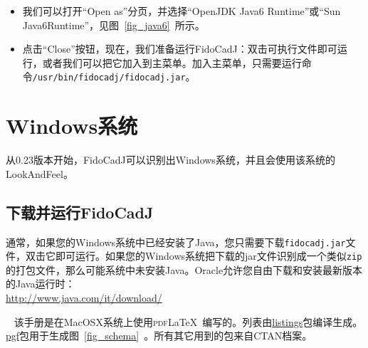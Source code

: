 \documentclass[10pt,a4paper,twoside]{scrreprt}
\begin{document}
\begin{itemize}
\item {我们可以打开“Open as”分页，并选择“OpenJDK Java6 Runtime”或“Sun Java6Runtime”，见图~\ref{fig_java6}~所示。}

\item {点击“Close”按钮，现在，我们准备运行FidoCadJ：双击可执行文件即可运行，或者我们可以把它加入到主菜单。加入主菜单，只需要运行命令\lstinline!/usr/bin/fidocadj/fidocadj.jar!。}
\end{itemize}

\section{Windows系统}
从0.23版本开始，FidoCadJ可以识别出Windows系统，并且会使用该系统的LookAndFeel。

\subsection{下载并运行FidoCadJ}
通常，如果您的Windows系统中已经安装了Java，您只需要下载\lstinline!fidocadj.jar!文件，双击它即可运行。如果您的Windows系统把下载的jar文件识别成一个类似\lstinline!zip!的打包文件，那么可能系统中未安装Java。Oracle允许您自由下载和安装最新版本的Java运行时：\\ \href{http://www.java.com/it/download/}{http://www.java.com/it/download/}

\printindex 
\cleardoublepage
\thispagestyle{empty}
\mbox{ }
\vfill
该手册是在MacOSX系统上使用\textsc{pdf}\LaTeX\ 编写的。列表由\href{http://www.ctan.org/tex-archive/macros/latex/contrib/listings/}{listings}包编译生成。\href{http://www.ctan.org/tex-archive/graphics/pgf/}{pgf}包用于生成图~\ref{fig_schema}~。所有其它用到的包来自CTAN档案。

\end{document}
